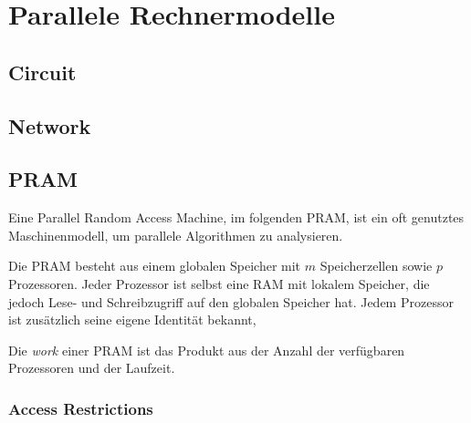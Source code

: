\section{Parallele Rechnermodelle}

\subsection{Circuit}

\subsection{Network}


\subsection{PRAM}
Eine Parallel Random Access Machine, im folgenden PRAM, ist ein oft genutztes Maschinenmodell, um parallele Algorithmen zu analysieren.

Die PRAM besteht aus einem globalen Speicher mit $m$ Speicherzellen sowie $p$ Prozessoren.
Jeder Prozessor ist selbst eine RAM mit lokalem Speicher, die jedoch Lese- und Schreibzugriff auf den globalen Speicher hat.
Jedem Prozessor ist zusätzlich seine eigene Identität bekannt,

Die \emph{work} einer PRAM ist das Produkt aus der Anzahl der verfügbaren Prozessoren und der Laufzeit.

\cite{reif}

\subsubsection{Access Restrictions}
